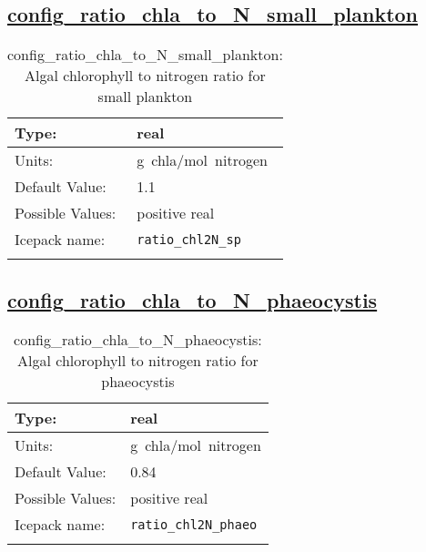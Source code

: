 \subsection[config\_ratio\_chla\_to\_N\_small\_plankton]{\hyperref[sec:nm_tab_biogeochemistry]{config\_ratio\_chla\_to\_N\_small\_plankton}}
\label{subsec:nm_sec_config_ratio_chla_to_N_small_plankton}
\begin{center}
\begin{longtable}{| p{2.0in} || p{4.0in} |}
    \hline
    Type: & real \\
    \hline
    Units: & \si{g.chla/mol.nitrogen} \\
    \hline
    Default Value: & 1.1 \\
    \hline
    Possible Values: & positive real \\
    \hline
    \hline
    Icepack name: & \verb+ratio_chl2N_sp+ \\
    \caption{config\_ratio\_chla\_to\_N\_small\_plankton: Algal chlorophyll to nitrogen ratio for small plankton}
\end{longtable}
\end{center}
\subsection[config\_ratio\_chla\_to\_N\_phaeocystis]{\hyperref[sec:nm_tab_biogeochemistry]{config\_ratio\_chla\_to\_N\_phaeocystis}}
\label{subsec:nm_sec_config_ratio_chla_to_N_phaeocystis}
\begin{center}
\begin{longtable}{| p{2.0in} || p{4.0in} |}
    \hline
    Type: & real \\
    \hline
    Units: & \si{g.chla/mol.nitrogen} \\
    \hline
    Default Value: & 0.84 \\
    \hline
    Possible Values: & positive real \\
    \hline
    \hline
    Icepack name: & \verb+ratio_chl2N_phaeo+ \\
    \caption{config\_ratio\_chla\_to\_N\_phaeocystis: Algal chlorophyll to nitrogen ratio for phaeocystis}
\end{longtable}
\end{center}
